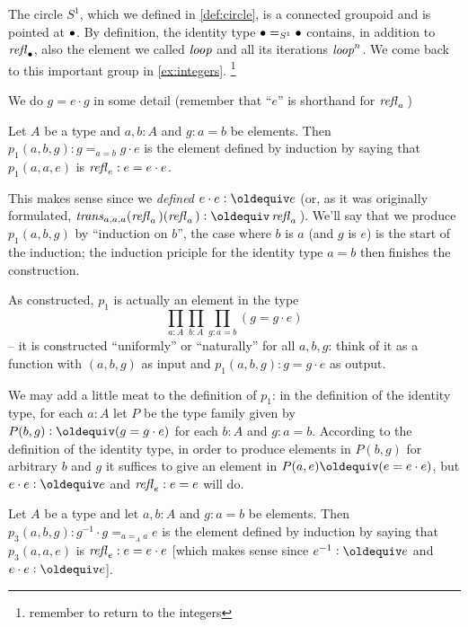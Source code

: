    \begin{example}\label{excirclegroup}
   The circle $S^1$, which we defined in \cref{def:circle}, is a connected groupoid and is pointed at $\bullet$.  By definition, the identity type $\bullet=_{S^1}\bullet$ contains, in addition to $\mathop{{\it refl}_{\bullet}}$, also the element we called $\mathit{loop}$ and all its iterations $\mathit{loop}^n$.   We come back to this important group in \cref{ex:integers}.  \footnote{remember to return to the integers}
 \end{example}


We do $g=e\cdot g$ in some detail (remember that ``$e$'' is shorthand for $\mathop{{\it refl}_{a}}{}$)
\begin{definition}\label{def:p1}
  Let $A$ be a type and $a, b:A$ and $g:a=b$ be elements.  Then $p_1(a,b,g):g=_{a=b}g\cdot e$ is the element defined by induction by saying that $p_1(a,a,e)$ is $\mathop{{\it refl}_{e}}:e=e\cdot e$.
\end{definition}
\begin{remark}
  This makes sense since we \emph{defined} $e\cdot e\defequi e$ (or, as it was originally formulated, $\trans_{a,a,a}(\refl a{})(\refl a{})\defequi \refl a{}$).  We'll say that we produce $p_1(a,b,g)$ by ``induction on $b$'', the case where $b$ is $a$ (and $g$ is $e$) is the start of the induction; the induction priciple for the identity type $a=b$ then finishes the construction.

As constructed, $p_1$ is actually an element in the type
$$\prod_{a:A}\prod_{b:A}\prod_{g:a=b}(g=g\cdot e)$$ -- it is constructed ``uniformly'' or ``naturally'' for all $a,b,g$: think of it as a function with $(a,b,g)$ as input and $p_1(a,b,g):g=g\cdot e$ as output.

We may add a little meat to the definition of $p_1$: in the definition of the identity type, for each $a:A$ let $P$ be the type family given by $P(b,g)\defequi (g=g\cdot e)$ for each $b:A$ and $g:a=b$.  According to the definition of the identity type, in order to produce elements in $P(b,g)$ for arbitrary $b$ and $g$ it suffices to give an element in $P(a,e)\oldequiv (e=e\cdot e)$, but $e\cdot e\defequi e$ and $\mathop{{\it refl}_{e}}:e=e$ will do.
\end{remark}
\begin{definition}\label{def:p3}
  Let $A$ be a type and let $a,b:A$ and $g:a=b$ be elements.  Then $p_3(a,b,g):g^{-1}\cdot g=_{a=_Aa} e$ is the element defined by induction by saying that $p_3(a,a,e)$ is $\mathop{{\it refl}_{e}}:e=e\cdot e$ [which makes sense since $e^{-1}\defequi e$ and $e\cdot e\defequi e$].
\end{definition}
